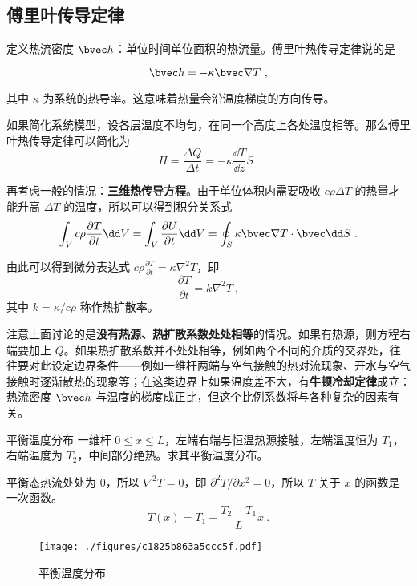 

\subsection{傅里叶传导定律}
定义热流密度 $\bvec h$：单位时间单位面积的热流量。傅里叶热传导定律说的是

\begin{equation}
\bvec h = -\kappa \bvec \nabla T~,
\end{equation}

其中 $\kappa$ 为系统的热导率。这意味着热量会沿温度梯度的方向传导。

如果简化系统模型，设各层温度不均匀，在同一个高度上各处温度相等。那么傅里叶热传导定律可以简化为
\begin{equation}
H=\frac{\Delta Q}{\Delta t}=-\kappa \frac{\dd T}{\dd z}S~.
\end{equation}

再考虑一般的情况：\textbf{三维热传导方程}。由于单位体积内需要吸收 $c\rho \Delta T$ 的热量才能升高 $\Delta T$ 的温度，所以可以得到积分关系式
\begin{equation}\label{eq_heatc_1}
\int_V c\rho \frac{\partial T}{\partial t} \dd V = \int_V \frac{\partial U}{\partial t} \dd V= \oint_S \kappa \bvec \nabla T \cdot \bvec \dd S~.
\end{equation}

由此可以得到微分表达式 $c\rho \frac{\partial T}{\partial t} = \kappa \nabla^2 T$，即
\begin{equation}\label{eq_heatc_2}
\frac{\partial T}{\partial t}=k\nabla^2 T~,
\end{equation}
其中 $k=\kappa/c\rho$ 称作热扩散率。

注意上面讨论的是\textbf{没有热源、热扩散系数处处相等}的情况。如果有热源，则方程右端要加上 $Q$。如果热扩散系数并不处处相等，例如两个不同的介质的交界处，往往要对此设定边界条件——例如一维杆两端与空气接触的热对流现象、开水与空气接触时逐渐散热的现象等；在这类边界上如果温度差不大，有\textbf{牛顿冷却定律}成立：热流密度 $\bvec h$ 与温度的梯度成正比，但这个比例系数将与各种复杂的因素有关。

\begin{example}{平衡温度分布}
一维杆 $0\le x\le L$，左端右端与恒温热源接触，左端温度恒为 $T_1$，右端温度为 $T_2$，中间部分绝热。求其平衡温度分布。

平衡态热流处处为 $0$，所以 $\nabla^2 T=0$，即 $\partial^2 T/\partial x^2=0$，所以 $T$ 关于 $x$ 的函数是一次函数。
\begin{equation}
T(x)=T_1+\frac{T_2-T_1}{L}x~.
\end{equation}

\begin{figure}[ht]
\centering
\texttt{[image: ./figures/c1825b863a5ccc5f.pdf]}
\caption{平衡温度分布} \label{fig_heatc_2}
\end{figure}
\end{example}

